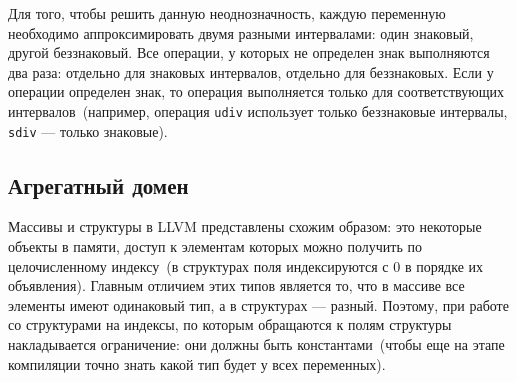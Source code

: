 Для того, чтобы решить данную неоднозначность, каждую переменную необходимо
аппроксимировать двумя разными интервалами: один знаковый, другой беззнаковый.
Все операции, у которых не определен знак выполняются два раза: отдельно для
знаковых интервалов, отдельно для беззнаковых. Если у операции определен знак,
то операция выполняется только для соответствующих интервалов~(например, 
операция \texttt{udiv} использует только беззнаковые интервалы, 
\texttt{sdiv} --- только знаковые).

\subsection{Агрегатный домен}
Массивы и структуры в LLVM представлены схожим образом: это некоторые объекты 
в памяти, доступ к элементам которых можно получить по целочисленному индексу~(в 
структурах поля индексируются с 0 в порядке их объявления). Главным отличием 
этих типов является то, что в массиве все элементы имеют одинаковый тип, а в 
структурах --- разный. Поэтому, при работе со структурами на индексы, по 
которым обращаются к полям структуры накладывается ограничение: они должны 
быть константами~(чтобы еще на этапе компиляции точно знать какой тип будет у 
всех переменных).

